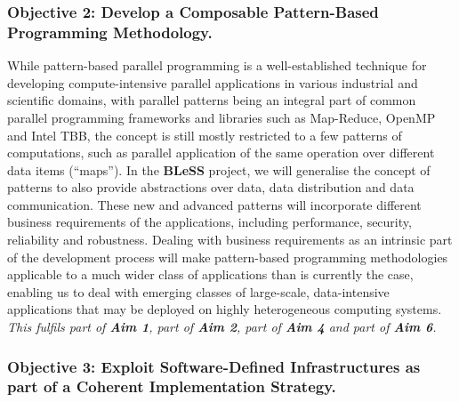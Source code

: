 \documentclass[a4paper,11pt]{article}
\newcommand{\project}[1]{\textbf{#1}\xspace}
\newcommand{\BLESS}{\project{BLeSS}}
\newcommand{\TheProject}{\BLESS}
\begin{document}
\subsubsection*{Objective 2: Develop a Composable Pattern-Based Programming Methodology.}
\vspace{-6pt}

While pattern-based parallel programming is a well-established technique for developing compute-intensive
parallel applications in various industrial and scientific domains, with parallel patterns being an
integral part of common parallel programming frameworks and libraries such as Map-Reduce, OpenMP and 
Intel TBB, the concept is still mostly restricted to a few patterns of computations, such as parallel application
of the same operation over different data items (``maps''). In the \TheProject{} project, we will generalise the concept 
of patterns to also provide abstractions over data, data distribution and data communication.  These new and advanced
patterns will incorporate different business requirements of the applications, including performance, security, reliability and robustness. 
Dealing with business requirements as an intrinsic part of the development process
will make pattern-based programming methodologies applicable to a much wider class of applications
than is currently the case, enabling us to deal with emerging classes of large-scale, data-intensive
applications that may be deployed on highly heterogeneous computing systems.
\newline
\emph{This fulfils part of \textbf{Aim 1}, part of \textbf{Aim 2}, part of \textbf{Aim 4} and part of \textbf{Aim 6}.}


\subsubsection*{Objective 3: Exploit Software-Defined Infrastructures as part of a Coherent Implementation Strategy.}
\vspace{-6pt}
\end{document}
